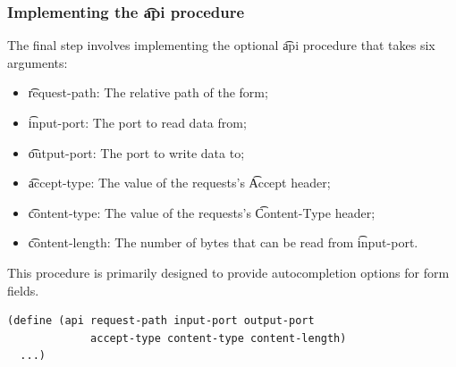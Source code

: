 \subsubsection{Implementing the \t{api} procedure}

  The final step involves implementing the optional \t{api} procedure
  that takes six arguments:
  \begin{itemize}
  \item \t{request-path}:   The relative path of the form;
  \item \t{input-port}:     The port to read data from;
  \item \t{output-port}:    The port to write data to;
  \item \t{accept-type}:    The value of the requests's \t{Accept} header;
  \item \t{content-type}:   The value of the requests's \t{Content-Type} header;
  \item \t{content-length}: The number of bytes that can be read from
    \t{input-port}.
  \end{itemize}

  This procedure is primarily designed to provide autocompletion options
  for form fields.

\begin{siderules}
\begin{verbatim}
(define (api request-path input-port output-port
             accept-type content-type content-length)
  ...)
\end{verbatim}
\end{siderules}
